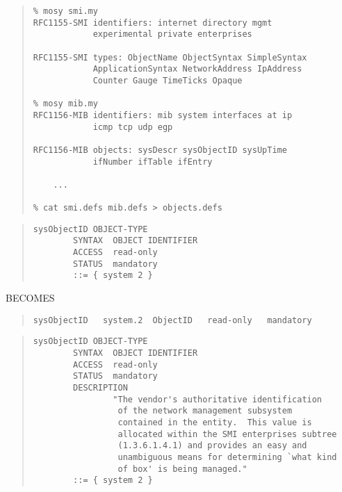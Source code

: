 \begin{bwslide}

\begin{quote}\small\begin{verbatim}
% mosy smi.my
RFC1155-SMI identifiers: internet directory mgmt
            experimental private enterprises

RFC1155-SMI types: ObjectName ObjectSyntax SimpleSyntax
            ApplicationSyntax NetworkAddress IpAddress
            Counter Gauge TimeTicks Opaque

% mosy mib.my
RFC1156-MIB identifiers: mib system interfaces at ip
            icmp tcp udp egp

RFC1156-MIB objects: sysDescr sysObjectID sysUpTime
            ifNumber ifTable ifEntry

    ...

% cat smi.defs mib.defs > objects.defs
\end{verbatim}\end{quote}
\end{bwslide}


\begin{bwslide}

\begin{quote}\small\begin{verbatim}
sysObjectID OBJECT-TYPE
        SYNTAX  OBJECT IDENTIFIER
        ACCESS  read-only
        STATUS  mandatory
        ::= { system 2 }
\end{verbatim}\end{quote}
BECOMES
\begin{quote}\small\begin{verbatim}
sysObjectID   system.2  ObjectID   read-only   mandatory
\end{verbatim}\end{quote}
\end{bwslide}


\begin{bwslide}

\begin{quote}\small\begin{verbatim}
sysObjectID OBJECT-TYPE
        SYNTAX  OBJECT IDENTIFIER
        ACCESS  read-only
        STATUS  mandatory
        DESCRIPTION
                "The vendor's authoritative identification
                 of the network management subsystem
                 contained in the entity.  This value is
                 allocated within the SMI enterprises subtree
                 (1.3.6.1.4.1) and provides an easy and
                 unambiguous means for determining `what kind
                 of box' is being managed."
        ::= { system 2 }
\end{verbatim}\end{quote}
\end{bwslide}


